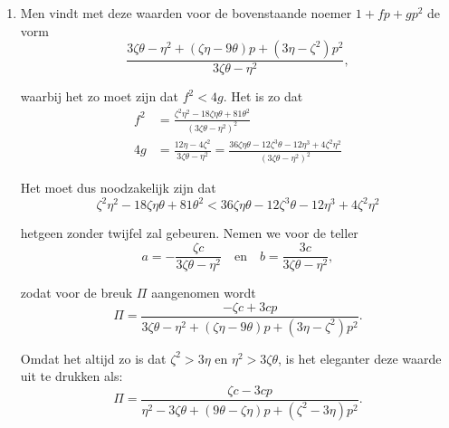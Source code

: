 \documentclass[10pt,a4paper]{article}
\newcommand{\switchenum}{\setcounter{enumi}{\arabic{enumi}-1}\switchcolumn}
\begin{document}
\begin{paracol}{2}
\begin{enumerate}[topsep=1px]
		\switchenum
		\item Men vindt met deze waarden voor de bovenstaande noemer $1+fp+gp^2$ de vorm
		\[
			\frac{3\zeta \theta - \eta^2 + (\zeta \eta - 9\theta)p + (3\eta -\zeta^2)p^2}{3\zeta \theta - \eta^2},
		\]
		\par waarbij het zo moet zijn dat $f^2< 4g$. Het is zo dat
		\begin{align*}
			f^2&= \frac{\zeta^2 \eta^2 -18\zeta \eta \theta + 81 \theta^2}{(3\zeta \theta - \eta^2)^2}\\
			4g &= \frac{12\eta - 4\zeta^2 }{3\zeta \theta-\eta^2} = \frac{36\zeta \eta \theta - 12 \zeta ^3\theta - 12 \eta^3+4\zeta^2 \eta^2}{(3\zeta \theta - \eta^2)^2}
		\end{align*}
		\par Het moet dus noodzakelijk zijn dat
		\[
			\zeta^2 \eta^2 -18 \zeta \eta \theta +81 \theta^2 < 36 \zeta \eta \theta - 12 \zeta^3\theta -12\eta^3 + 4 \zeta^2 \eta^2
		\]
		\par hetgeen zonder twijfel zal gebeuren. Nemen we voor de teller
		\[
			a = - \frac{\zeta c}{3\zeta \theta - \eta^2} \quad \text{en}\quad b = \frac{3c}{3\zeta \theta - \eta^2},
		\]
		\par zodat voor de breuk $\Pi$ aangenomen wordt
		\[
			\Pi = \frac{-\zeta c + 3cp}{3\zeta \theta -\eta^2 +(\zeta \eta - 9\theta)p+(3\eta - \zeta^2)p^2}.
		\]
		\par Omdat het altijd zo is dat $\zeta^2 > 3\eta$ en $\eta^2 > 3\zeta \theta$, is het eleganter deze waarde uit te drukken als:
		\[
			\Pi = \frac{\zeta c - 3cp }{\eta^2 - 3\zeta \theta +(9\theta - \zeta \eta)p + (\zeta^2 - 3\eta)p^2}.
		\]

		
		\switchcolumn*
		

\end{enumerate}
\end{paracol}
\end{document}
